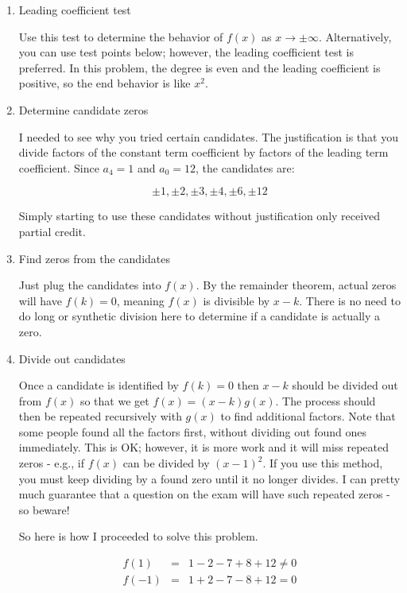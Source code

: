 \documentclass[letterpaper, 12pt]{article}
\begin{document}
\begin{enumerate}

\item{Leading coefficient test}

Use this test to determine the behavior of $f(x)$ as $x\to\pm\infty$.
Alternatively, you can use test points below; however, the leading coefficient
test is preferred. In this problem, the degree is even and the leading
coefficient is positive, so the end behavior is like $x^2$.

\item{Determine candidate zeros}

I needed to see why you tried certain candidates. The justification is that you
divide factors of the constant term coefficient by factors of the leading term
coefficient.  Since $a_4=1$ and $a_0=12$, the candidates are:

\[\pm1,\pm2,\pm3,\pm4,\pm6,\pm12\]

Simply starting to use these candidates without justification only received
partial credit.

\item{Find zeros from the candidates}

Just plug the candidates into $f(x)$. By the remainder theorem, actual zeros
will have $f(k)=0$, meaning $f(x)$ is divisible by $x-k$. There is no need
to do long or synthetic division here to determine if a candidate is actually
a zero.

\item{Divide out candidates}

Once a candidate is identified by $f(k)=0$ then $x-k$ should be divided out
from $f(x)$ so that we get $f(x)=(x-k)g(x)$. The process should then be
repeated recursively with $g(x)$ to find additional factors. Note that some
people found all the factors first, without dividing out found ones
immediately. This is OK; however, it is more work and it will miss repeated
zeros - e.g., if $f(x)$ can be divided by $(x-1)^2$. If you use this method,
you must keep dividing by a found zero until it no longer divides. I can
pretty much guarantee that a question on the exam will have such repeated
zeros - so beware!

\bigskip

So here is how I proceeded to solve this problem.

\begin{eqnarray*}
f(1) &=& 1-2-7+8+12\ne0 \\
f(-1) &=& 1+2-7-8+12=0 \\
\end{eqnarray*}


\end{enumerate}
\end{document}
